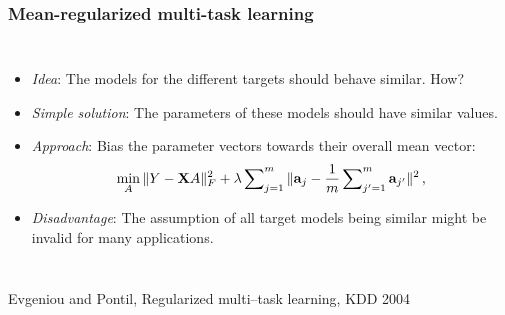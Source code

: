 \documentclass[11pt,compress,t,notes=noshow, xcolor=table]{beamer}
\newcommand{\ba}{\mathbf{a}}
\begin{document}
\begin{frame}[t]
	\frametitle{Mean-regularized multi-task learning}
	
	\vspace{0.2cm}
	\begin{columns}
		\column{5cm}
		\footnotesize{
			\begin{itemize} 
%				
				\item \emph{Idea}: The models for the different targets should behave similar. How?
%				
				\item \emph{Simple solution}: The parameters of these models should have similar values.
%				
				\item \emph{Approach}: Bias the parameter vectors towards their overall mean vector:
					\vspace{0.2cm}
				\begin{equation*}
					\label{eq:meanreg}
					\min_A \|Y - \Xmat A \|^2_F + \lambda \sum\nolimits_{j=1}^m \|\ba_j - \frac{1}{m} \sum\nolimits_{j'=1}^m \ba_{j'} \|^2 \, ,
				\end{equation*}
%				
				\item \emph{Disadvantage}: The assumption of all target models being similar might be invalid for many applications. \lz
			\end{itemize}
		}
		\column{4.5cm}
		
%	
	\end{columns}

{\tiny Evgeniou and Pontil, Regularized multi--task learning, KDD 2004}
\end{frame}
\end{document}
